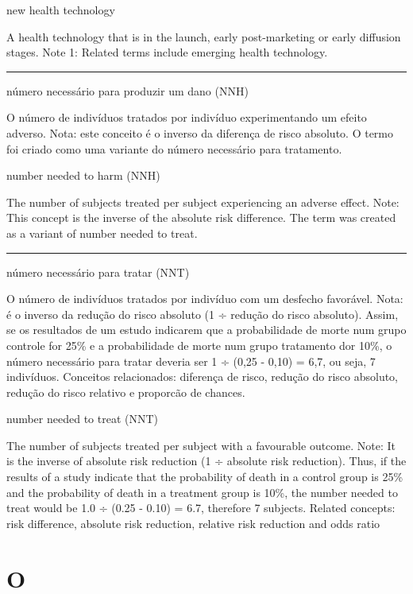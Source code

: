 \documentclass[
  openany]{book}
\begin{document}
new health technology

A health technology that is in the launch, early post-marketing or early diffusion stages. Note 1: Related terms include emerging health technology.

\begin{center}\rule{0.5\linewidth}{0.5pt}\end{center}

número necessário para produzir um dano (NNH)

O número de indivíduos tratados por indivíduo experimentando um efeito adverso. Nota: este conceito é o inverso da diferença de risco absoluto. O termo foi criado como uma variante do número necessário para tratamento.

number needed to harm (NNH)

The number of subjects treated per subject experiencing an adverse effect. Note: This concept is the inverse of the absolute risk difference. The term was created as a variant of number needed to treat.

\begin{center}\rule{0.5\linewidth}{0.5pt}\end{center}

número necessário para tratar (NNT)

O número de indivíduos tratados por indivíduo com um desfecho favorável. Nota: é o inverso da redução do risco absoluto (1 ÷ redução do risco absoluto). Assim, se os resultados de um estudo indicarem que a probabilidade de morte num grupo controle for 25\% e a probabilidade de morte num grupo tratamento dor 10\%, o número necessário para tratar deveria ser 1 ÷ (0,25 - 0,10) = 6,7, ou seja, 7 indivíduos. Conceitos relacionados: diferença de risco, redução do risco absoluto, redução do risco relativo e proporcão de chances.

number needed to treat (NNT)

The number of subjects treated per subject with a favourable outcome. Note: It is the inverse of absolute risk reduction (1 ÷ absolute risk reduction). Thus, if the results of a study indicate that the probability of death in a control group is 25\% and the probability of death in a treatment group is 10\%, the number needed to treat would be 1.0 ÷ (0.25 - 0.10) = 6.7, therefore 7 subjects. Related concepts: risk difference, absolute risk reduction, relative risk reduction and odds ratio

\hypertarget{o}{%
\chapter*{O}\label{o}}
\end{document}
